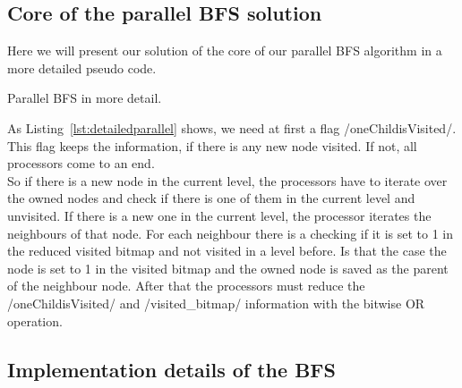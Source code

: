 \documentclass[12pt,a4paper]{article}
\begin{document}
\subsection{Core of the parallel BFS solution}
\label{sec:core}
Here we will present our solution of the core of our parallel BFS algorithm in a more detailed pseudo code.\\
\begin{listing}[h]
\begin{ccode}
/*
input: every proc has adjacency buffer of owned nodes, visited_bitmap where root is set to one
output: parent array
*/
void* BFS(buffer, visited_bitmap){
	char oneChildisVisited = 1;
	while (oneChildisVisited){
	oneChildisVisited = 0;
	for (i = 0; i < size(nodes_owned); i++){
		if (nodes_owned[i] is visited for the first time) {
			for (j = 0; j < size(neighbours); j++){
				if (neighbours[j] is not visited) {
					oneChildisVisited = 1;
					set_visited_bitmap(visited_bitmap, neighbours[j]); // sets the visited bitmap on position of neighbour[j] to 1
					save_parent(parent_array, nodes_owned[i]+1,neighbours[j]); // saves that nodes_owned[i]+1 is parent of neighbours[j] in parent array
				}
			}
		}	
	}
	allreduce(oneChildisVisited); // all procs get the information if there is a neighbour visited at all
	if (oneChildisVisited){
		allreduce(visited_bitmap, BITWISE_OR); // there has to be a reduction of all visited bitmaps to one
	}
	return parent_array;
}
\end{ccode}
\caption{Parallel BFS in more detail.}
\label{lst:detailedparallel}
\end{listing}
As Listing~\ref{lst:detailedparallel} shows, we need at first a flag \cinline/oneChildisVisited/. This flag keeps the information, if there is any new node visited. If not, all processors come to an end.\\
So if there is a new node in the current level, the processors have to iterate over the owned nodes and check if there is one of them in the current level and unvisited. If there is a new one in the current level, the processor iterates the neighbours of that node. For each neighbour there is a checking if it is set to 1 in the reduced visited bitmap and not visited in a level before. Is that the case the node is set to 1 in the visited bitmap and the owned node is saved as the parent of the neighbour node. After that the processors must reduce the \cinline/oneChildisVisited/ and \cinline/visited_bitmap/ information with the bitwise OR operation.

\subsection{Implementation details of the BFS}
\end{document}
